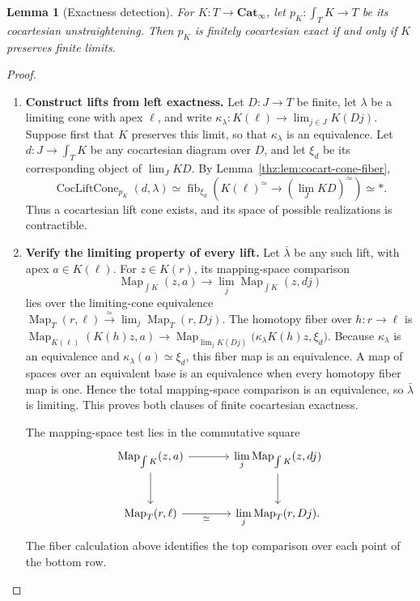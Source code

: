 \documentclass[oneside]{article}
\theoremstyle{plain}
\newtheorem{lemma}[theorem]{Lemma}
\theoremstyle{definition}
\theoremstyle{remark}
\newcommand{\Cat}{\mathbf{Cat}_{\infty}}
\newcommand{\Map}{\operatorname{Map}}
\newcommand{\fib}{\operatorname{fib}}
\begin{document}
\begin{lemma}[Exactness detection]\label{thz:lem:exact}
For $K:T\to\Cat$, let
$p_K:\int_TK\to T$ be its cocartesian unstraightening.  Then $p_K$ is
finitely cocartesian exact if and only if $K$ preserves finite limits.
\end{lemma}
\begin{proof}
\leavevmode
\begin{enumerate}
\item \textbf{Construct lifts from left exactness.} Let $D:J\to T$ be finite, let $\lambda$ be a limiting cone with apex
$\ell$, and write $\kappa_\lambda:K(\ell)\longrightarrow\lim_{j\in J}K(Dj).$
Suppose first that $K$ preserves this limit, so that $\kappa_\lambda$ is an
equivalence.  Let $d:J\to\int_TK$ be any cocartesian diagram over $D$, and
let $\xi_d$ be its corresponding object of $\lim_JKD$.  By
Lemma~\ref{thz:lem:cocart-cone-fiber},
\[
 \operatorname{CocLiftCone}_{p_K}(d,\lambda)
 \simeq
 \fib_{\xi_d}\!\left(
   K(\ell)^{\simeq}
   \longrightarrow
   \left(\lim_JKD\right)^{\simeq}
 \right)
 \simeq *.
\]
Thus a cocartesian lift cone exists, and its space of possible realizations
is contractible.
\item \textbf{Verify the limiting property of every lift.} Let $\bar\lambda$ be any such lift, with apex $a\in K(\ell)$.  For
$z\in K(r)$, its mapping-space comparison
\[
 \Map_{\int K}(z,a)\longrightarrow
 \lim_j\Map_{\int K}(z,dj)
\]
lies over the limiting-cone equivalence $\Map_T(r,\ell)\xrightarrow{\simeq} \lim_j\Map_T(r,Dj).$ The homotopy fiber over $h:r\to\ell$ is $\Map_{K(\ell)}(K(h)z,a)\longrightarrow \Map_{\lim_jK(Dj)} \bigl(\kappa_\lambda K(h)z,\xi_d\bigr).$ Because $\kappa_\lambda$ is an equivalence and
$\kappa_\lambda(a)\simeq\xi_d$, this fiber map is an equivalence.  A map
of spaces over an equivalent base is an equivalence when every homotopy
fiber map is one.  Hence the total mapping-space comparison is an
equivalence, so $\bar\lambda$ is limiting.  This proves both clauses of
finite cocartesian exactness.
\begin{samepage}
The mapping-space test lies in the commutative square
\[
\begin{tikzcd}[column sep=large,row sep=large]
 \Map_{\int K}(z,a)\ar[r]\ar[d]&
 \displaystyle\lim_j\Map_{\int K}(z,dj)\ar[d]\\
 \Map_T(r,\ell)\ar[r,"\simeq"']&
 \displaystyle\lim_j\Map_T(r,Dj).
\end{tikzcd}
\]
The fiber calculation above identifies the top comparison over each
point of the bottom row.

\end{samepage}
\end{enumerate}
\end{proof}
\end{document}
